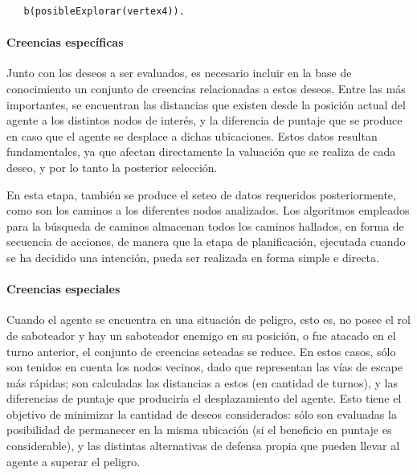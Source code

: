  \begin{verbatim}
   b(posibleExplorar(vertex4)).
 \end{verbatim}
  
 \paragraph{Creencias específicas} 

  
 Junto con los deseos a ser evaluados, es necesario incluir en la base
 de conocimiento un conjunto de creencias relacionadas a estos deseos.
 Entre las más importantes, se encuentran las distancias que existen
 desde la posición actual del agente a los distintos nodos de interés,
 y la diferencia de puntaje que se produce en caso que el agente se
 desplace a dichas ubicaciones.
 Estos datos resultan fundamentales, ya que afectan directamente la
 valuación que se realiza de cada deseo, y por lo tanto la posterior
 selección.
  
 En esta etapa, también se produce el seteo de datos requeridos
 posteriormente, como son los caminos a los diferentes nodos
 analizados.
 Los algoritmos empleados para la búsqueda de caminos almacenan todos
 los caminos hallados, en forma de secuencia de acciones, de manera que
 la etapa de planificación, ejecutada cuando se ha decidido una
 intención, pueda ser realizada en forma simple e directa.
  
 \paragraph{Creencias especiales} 

  
 Cuando el agente se encuentra en una situación de peligro, esto es, no
 posee el rol de saboteador y hay un saboteador enemigo en su posición,
 o fue atacado en el turno anterior, el conjunto de creencias seteadas
 se reduce.
 En estos casos, sólo son tenidos en cuenta los nodos vecinos, dado que
 representan las vías de escape más rápidas; son calculadas las
 distancias a estos (en cantidad de turnos), y las diferencias de
 puntaje que produciría el desplazamiento del agente.
 Esto tiene el objetivo de minimizar la cantidad de deseos
 considerados: sólo son evaluadas la posibilidad de permanecer en la
 misma ubicación (si el beneficio en puntaje es considerable), y las
 distintas alternativas de defensa propia que pueden llevar al agente a
 superar el peligro.

